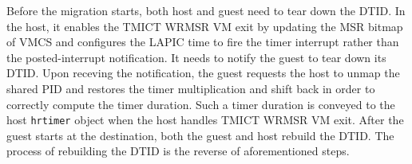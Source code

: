 Before the migration starts, both host and guest need to tear
down the DTID. In the host, it enables the TMICT WRMSR VM exit
by updating the MSR bitmap of VMCS and configures the LAPIC
time to fire the timer interrupt rather than the
posted-interrupt notification. It needs to notify the guest to
tear down its DTID. Upon receving the notification, the guest
requests the host to unmap the shared PID and restores the
timer multiplication and shift back in order to correctly
compute the timer duration. Such a timer duration is conveyed
to the host \texttt{hrtimer} object when the host handles
TMICT WRMSR VM exit. After the guest starts at the
destination, both the guest and host rebuild the DTID. The
process of rebuilding the DTID is the reverse of
aforementioned steps.
